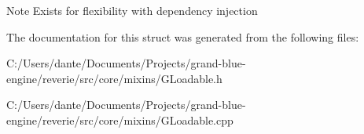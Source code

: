 \begin{DoxyNote}{Note}
Exists for flexibility with dependency injection 
\end{DoxyNote}


The documentation for this struct was generated from the following files\+:\begin{DoxyCompactItemize}
\item 
C\+:/\+Users/dante/\+Documents/\+Projects/grand-\/blue-\/engine/reverie/src/core/mixins/G\+Loadable.\+h\item 
C\+:/\+Users/dante/\+Documents/\+Projects/grand-\/blue-\/engine/reverie/src/core/mixins/G\+Loadable.\+cpp\end{DoxyCompactItemize}
